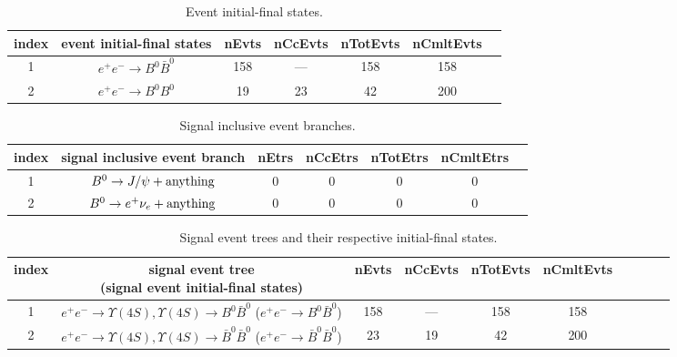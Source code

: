 \documentclass[landscape]{article}
\begin{document}
\clearpage

\begin{table}[htbp!]
\caption{Event initial-final states.}
\small
\centering
\begin{tabular}{|c|c|c|c|c|c|c|}
\hline
index & event initial-final states & nEvts & nCcEvts & nTotEvts & nCmltEvts \\
\hline
1 & $ e^{+} e^{-} \rightarrow B^{0} \bar{B}^{0} $ & 158 & --- & 158 & 158 \\
\hline
2 & $ e^{+} e^{-} \rightarrow B^{0} B^{0} $ & 19 & 23 & 42 & 200 \\
\hline
\end{tabular}
\end{table}

\clearpage

\begin{table}[htbp!]
\caption{Signal inclusive event branches.}
\small
\centering
\begin{tabular}{|c|c|c|c|c|c|c|}
\hline
index & signal inclusive event branch & nEtrs & nCcEtrs & nTotEtrs & 
nCmltEtrs \\
\hline
1 & $ B^{0} \rightarrow J/\psi  + \rm{anything}$ & 0 & 0 & 0 & 0 \\
\hline
2 & $ B^{0} \rightarrow e^{+} \nu_{e}  + \rm{anything}$ & 0 & 0 & 0 & 0 \\
\hline
\end{tabular}
\end{table}

\clearpage

\begin{table}[htbp!]
\caption{Signal event trees and their respective initial-final states.}
\small
\centering
\begin{tabular}{|c|c|c|c|c|c|c|c|c|c|}
\hline
index & \thead{signal event tree \\ (signal event initial-final states)} & nEvts & nCcEvts & nTotEvts & nCmltEvts \\
\hline
1 & \makecell{ $ 
e^{+} e^{-} \rightarrow \Upsilon(4S) ,
\Upsilon(4S) \rightarrow B^{0} \bar{B}^{0} 
$ \\ ($
e^{+} e^{-} \rightarrow B^{0} \bar{B}^{0} 
$) } & 158 & --- & 158 & 158 \\
\hline
2 & \makecell{ $ 
e^{+} e^{-} \rightarrow \Upsilon(4S) ,
\Upsilon(4S) \rightarrow \bar{B}^{0} \bar{B}^{0} 
$ \\ ($
e^{+} e^{-} \rightarrow \bar{B}^{0} \bar{B}^{0} 
$) } & 23 & 19 & 42 & 200 \\
\hline
\end{tabular}
\end{table}
\end{document}
